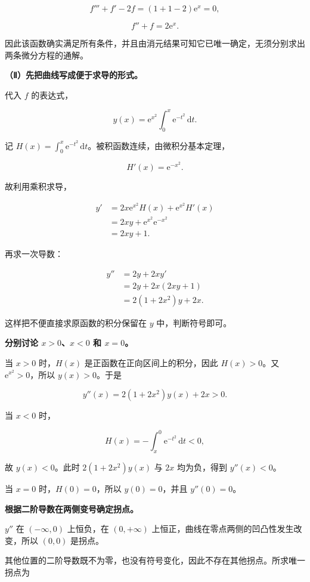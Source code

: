 \documentclass[UTF8,11pt,fontset=windows]{ctexart}
\begin{document}
$$
f'''+f'-2f=(1+1-2)\mathrm e^x=0,
$$

$$
f''+f=2\mathrm e^x.
$$

因此该函数确实满足所有条件，并且由消元结果可知它已唯一确定，无须分别求出两条微分方程的通解。

\textbf{（Ⅱ）先把曲线写成便于求导的形式。}

代入 $f$ 的表达式，

$$
y(x)=\mathrm e^{x^2}\int_0^x\mathrm e^{-t^2}\,\mathrm dt.
$$

记 $H(x)=\int_0^x\mathrm e^{-t^2}\,\mathrm dt$。被积函数连续，由微积分基本定理，

$$
H'(x)=\mathrm e^{-x^2}.
$$

故利用乘积求导，

$$
\begin{aligned}
y'
&=2x\mathrm e^{x^2}H(x)+\mathrm e^{x^2}H'(x)\\
&=2xy+\mathrm e^{x^2}\mathrm e^{-x^2}\\
&=2xy+1.
\end{aligned}
$$

再求一次导数：

$$
\begin{aligned}
y''
&=2y+2xy'\\
&=2y+2x(2xy+1)\\
&=2(1+2x^2)y+2x.
\end{aligned}
$$

这样把不便直接求原函数的积分保留在 $y$ 中，判断符号即可。

\textbf{分别讨论 $x>0$、$x<0$ 和 $x=0$。}

当 $x>0$ 时，$H(x)$ 是正函数在正向区间上的积分，因此 $H(x)>0$。又 $\mathrm e^{x^2}>0$，所以 $y(x)>0$。于是

$$
y''(x)=2(1+2x^2)y(x)+2x>0.
$$

当 $x<0$ 时，

$$
H(x)=-\int_x^0\mathrm e^{-t^2}\,\mathrm dt<0,
$$

故 $y(x)<0$。此时 $2(1+2x^2)y(x)$ 与 $2x$ 均为负，得到 $y''(x)<0$。

当 $x=0$ 时，$H(0)=0$，所以 $y(0)=0$，并且 $y''(0)=0$。

\textbf{根据二阶导数在两侧变号确定拐点。}

$y''$ 在 $(-\infty,0)$ 上恒负，在 $(0,+\infty)$ 上恒正，曲线在零点两侧的凹凸性发生改变，所以 $(0,0)$ 是拐点。

其他位置的二阶导数既不为零，也没有符号变化，因此不存在其他拐点。所求唯一拐点为
\end{document}
